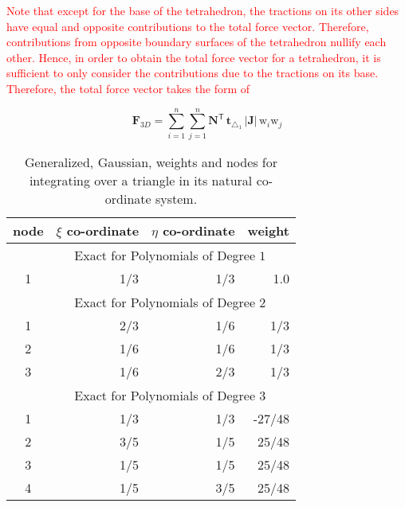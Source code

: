 \textcolor{red}{Note that except for the base of the tetrahedron, the tractions on its other sides have equal and opposite contributions to the total force vector. Therefore, contributions from opposite boundary surfaces of the tetrahedron nullify each other. Hence, in order to obtain the total force vector for a tetrahedron, it is sufficient to only consider the contributions due to the tractions on its base. Therefore, the total force vector takes the form of}

\begin{equation}
\mathbf{F}_{3D} = \sum_{i=1}^{n} \sum_{j=1}^{n} \mathbf{N}^{\mathsf{T}} \, \mathbf{t}_{\triangle_{1}} \,|\mathbf{J}| \, \mathrm{w}_i \mathrm{w}_j 
\end{equation}


\begin{table}
    \centering
    \begin{tabular}{|c|rrr|}
        \hline
        node & $\xi$ co-ordinate   & 
        $\eta$ co-ordinate & weight \\   \hline        
        & \multicolumn{3}{|c|}{Exact for Polynomials of Degree $1^{\phantom{|^|}}$} \\ 
        \hline
        1 & 1/3 & 1/3 & 1.0 \\ 
        \hline
        & \multicolumn{3}{|c|}{Exact for Polynomials of Degree $2^{\phantom{|^|}}$} \\ 
        \hline
        1 & 2/3 & 1/6 & 1/3\\
        2 & 1/6 & 1/6 & 1/3\\
        3 & 1/6 & 2/3 & 1/3\\ 
        \hline
        & \multicolumn{3}{|c|}{Exact for Polynomials of Degree $3^{\phantom{|^|}}$} \\ \hline
        1 & 1/3 & 1/3 & -27/48 \\
        2 & 3/5 & 1/5 & 25/48 \\
        3 & 1/5 & 1/5 & 25/48 \\ 
        4 & 1/5 & 3/5 & 25/48 \\
        \hline
    \end{tabular}
    \caption{Generalized, Gaussian, weights and nodes for integrating over a triangle in its natural co-ordinate system.}
    \label{tabGaussPointsTriangle}
\end{table}
